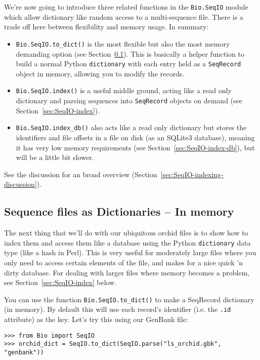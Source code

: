 We're now going to introduce three related functions in the \verb|Bio.SeqIO|
module which allow dictionary like random access to a multi-sequence file.
There is a trade off here between flexibility and memory usage. In summary:
\begin{itemize}
\item \verb|Bio.SeqIO.to_dict()| is the most flexible but also the most
memory demanding option (see Section~\ref{sec:seqio_todict}). This is basically
a helper function to build a normal Python \verb|dictionary| with each entry
held as a \verb|SeqRecord| object in memory, allowing you to modify the
records.
\item \verb|Bio.SeqIO.index()| is a useful middle ground, acting like a
read only dictionary and parsing sequences into \verb|SeqRecord| objects
on demand (see Section~\ref{sec:SeqIO-index}).
\item \verb|Bio.SeqIO.index_db()| also acts like a read only dictionary
but stores the identifiers and file offsets in a file on disk (as an
SQLite3 database), meaning it has very low memory requirements (see
Section~\ref{sec:SeqIO-index-db}), but will be a little bit slower.
\end{itemize}
See the discussion for an broad overview
(Section~\ref{sec:SeqIO-indexing-discussion}).

\subsection{Sequence files as Dictionaries -- In memory}
\label{sec:seqio_todict}

The next thing that we'll do with our ubiquitous orchid files is to show how
to index them and access them like a database using the Python \verb|dictionary|
data type (like a hash in Perl). This is very useful for moderately large files
where you only need to access certain elements of the file, and makes for a nice
quick 'n dirty database. For dealing with larger files where memory becomes a
problem, see Section~\ref{sec:SeqIO-index} below.

You can use the function \verb|Bio.SeqIO.to_dict()| to make a SeqRecord dictionary
(in memory).  By default this will use each record's identifier (i.e. the \verb|.id|
attribute) as the key.  Let's try this using our GenBank file:

\begin{verbatim}
>>> from Bio import SeqIO
>>> orchid_dict = SeqIO.to_dict(SeqIO.parse("ls_orchid.gbk", "genbank"))
\end{verbatim}

